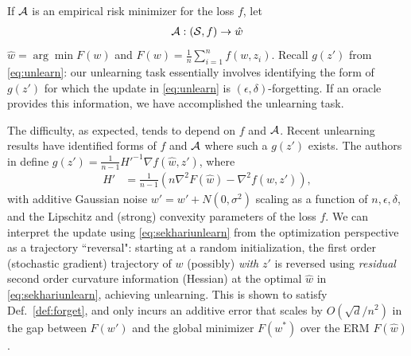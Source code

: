 If $\mathcal{A}$ is an empirical risk minimizer for the loss $f$, let
\begin{align}
    \cA : (\cS, f) \rightarrow \hat{w}%
\end{align}
$\hat{w} = \arg\min F(w)$ and $F(w) = \frac{1}{n}\sum_{i=1}^n f(w, z_i).$ 
Recall $g(z')$ from \eqref{eq:unlearn}:  
our unlearning task 
essentially involves 
identifying 
the form of $g(z')$ for which the update in \eqref{eq:unlearn} is $(\epsilon,\delta)$-forgetting. If an oracle provides this information, we have 
accomplished the unlearning task.

The difficulty, 
as expected, tends to 
depend on $f$ and $\mathcal{A}$. 
Recent unlearning results have identified forms of $f$ and $\mathcal{A}$ where such a $g(z')$ exists. The authors in \cite{sekhari2021remember} define $g(z') = \frac{1}{n-1}H'^{-1}\nabla f(\hat{w},z')$, where
\begin{align}\label{eq:sekhariunlearn}
    H' &= \frac{1}{n-1} \left(n\nabla^2 F(\hat{w}) - \nabla^2 f(\hat{w},z')\right),
\end{align}
with additive Gaussian noise $w' = w' + N(0,\sigma^2)$ scaling as a function of $n, \epsilon, \delta$, and the Lipschitz and (strong) convexity parameters of the loss $f$. We can interpret the update using \eqref{eq:sekhariunlearn} from the optimization perspective as a trajectory ``reversal": starting at a random initialization, the first order (stochastic gradient) trajectory of  ${w}$ (possibly) {\em with}  $z'$ is reversed using {\em residual} second order curvature information (Hessian) at the optimal $\hat{w}$ in \eqref{eq:sekhariunlearn}, achieving unlearning. This is shown to satisfy Def.~\ref{def:forget}, and only incurs an additive error that scales by $O(\sqrt{d}/n^2)$ in the gap between $F(w')$ and the global minimizer $F(w^*)$ over the ERM $F(\hat{w})$. 

